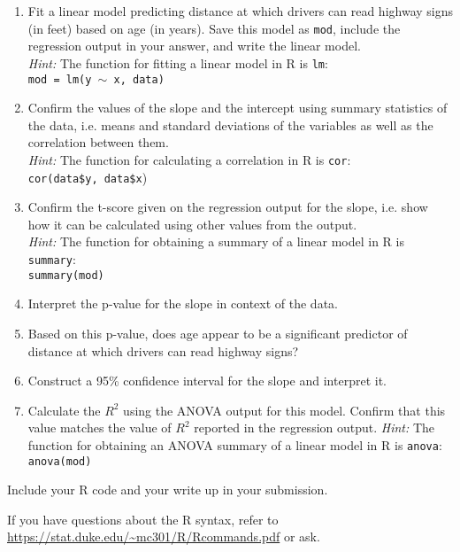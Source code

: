\documentclass[11pt]{article}
\begin{document}
\begin{enumerate}
\item Fit a linear model predicting distance at which drivers can read highway signs (in feet) based on age (in years). Save this model as \texttt{mod}, include the regression output in your answer, and write the linear model. \\
\textit{Hint:} The function for fitting a linear model in R is \texttt{lm}: \\
\texttt{mod = lm(y $\sim$ x, data)}
\item Confirm the values of the slope and the intercept using summary statistics of the data, i.e. means and standard deviations of the variables as well as the correlation between them. \\
\textit{Hint:} The function for calculating a correlation in R is \texttt{cor}: \\
\texttt{cor(data\$y, data\$x})
\item Confirm the t-score given on the regression output for the slope, i.e. show how it can be calculated using other values from the output. \\
\textit{Hint:} The function for obtaining a summary of a linear model in R is \texttt{summary}: \\\texttt{summary(mod)}
\item Interpret the p-value for the slope in context of the data.
\item Based on this p-value, does age appear to be a significant predictor of distance at which drivers can read highway signs?
\item Construct a 95\% confidence interval for the slope and interpret it.
\item Calculate the $R^2$ using the ANOVA output for this model. Confirm that this value matches the value of $R^2$ reported in the regression output.
\textit{Hint:} The function for obtaining an ANOVA summary of a linear model in R is \texttt{anova}: \\\texttt{anova(mod)}
 \end{enumerate}
 
Include your R code and your write up in your submission. 

If you have questions about the R syntax, refer to \url{https://stat.duke.edu/~mc301/R/Rcommands.pdf} or ask.

%
\end{document}

